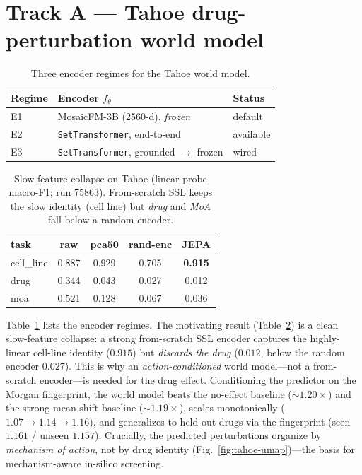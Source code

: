 \documentclass[10pt,twocolumn]{article}
\begin{document}
\section{Track A --- Tahoe drug-perturbation world model}
\label{sec:tahoe}

\begin{table}[t]
\centering\small
\caption{Three encoder regimes for the Tahoe world model.}
\label{tab:regimes}
\begin{tabular}{@{}lll@{}}
\toprule
\textbf{Regime} & \textbf{Encoder $f_\theta$} & \textbf{Status}\\
\midrule
E1 & MosaicFM-3B (2560-d), \emph{frozen} & default \\
E2 & \texttt{SetTransformer}, end-to-end & available \\
E3 & \texttt{SetTransformer}, grounded $\to$ frozen & wired \\
\bottomrule
\end{tabular}
\end{table}

\begin{table}[t]
\centering\small
\caption{Slow-feature collapse on Tahoe (linear-probe macro-F1; run 75863). From-scratch SSL keeps the
slow identity (cell line) but \emph{drug} and \emph{MoA} fall below a random encoder.}
\label{tab:tahoe-probe}
\begin{tabular}{@{}lcccc@{}}
\toprule
task & raw & pca50 & rand-enc & \textbf{JEPA} \\
\midrule
cell\_line & 0.887 & 0.929 & 0.705 & \textbf{0.915} \\
drug       & 0.344 & 0.043 & 0.027 & 0.012 \\
moa        & 0.521 & 0.128 & 0.067 & 0.036 \\
\bottomrule
\end{tabular}
\end{table}

Table~\ref{tab:regimes} lists the encoder regimes. The motivating result (Table~\ref{tab:tahoe-probe})
is a clean slow-feature collapse: a strong from-scratch SSL encoder captures the highly-linear cell-line
identity ($0.915$) but \emph{discards the drug} ($0.012$, below the random encoder $0.027$). This is why
an \emph{action-conditioned} world model---not a from-scratch encoder---is needed for the drug effect.
Conditioning the predictor on the Morgan fingerprint, the world model beats the no-effect baseline
($\sim\!1.20\times$) and the strong mean-shift baseline ($\sim\!1.19\times$),
scales monotonically ($1.07\!\to\!1.14\!\to\!1.16$), and generalizes to held-out drugs via the
fingerprint (seen $1.161$ / unseen $1.157$). Crucially, the predicted perturbations organize by
\emph{mechanism of action}, not by drug identity (Fig.~\ref{fig:tahoe-umap})---the basis for
mechanism-aware in-silico screening.
\end{document}
